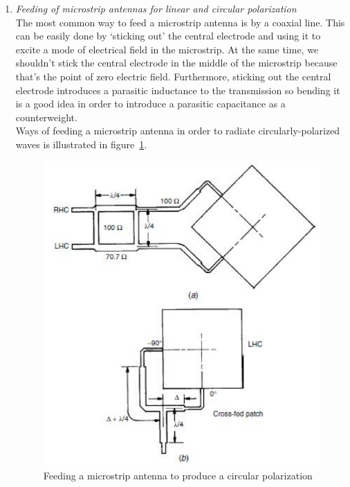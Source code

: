 \documentclass[11pt,a4paper]{article}
\begin{document}
\begin{enumerate}
    \item \emph{Feeding of microstrip antennas for linear and circular polarization}\\
    The most common way to feed a microstrip antenna is by a coaxial line. This can be easily done by `sticking out' the central electrode and using it to excite a mode of electrical field in the microstrip. At the same time, we shouldn't stick the central electrode in the middle of the microstrip because that's the point of zero electric field. Furthermore, sticking out the central electrode introduces a parasitic inductance to the transmission so bending it is a good idea in order to introduce a parasitic capacitance as a counterweight.\\
    Ways of feeding a microstrip antenna in order to radiate circularly-polarized waves is illustrated in figure~\ref{fig:patch-antenna-circular-polarization}.
    \begin{figure}[!ht]
        \centering
        \includegraphics[width=.6\textwidth]{src/patch-antenna-circular-polarization.png}
        \caption{\label{fig:patch-antenna-circular-polarization}Feeding a microstrip antenna to produce a circular polarization}
    \end{figure}
    

\end{enumerate}
\end{document}
